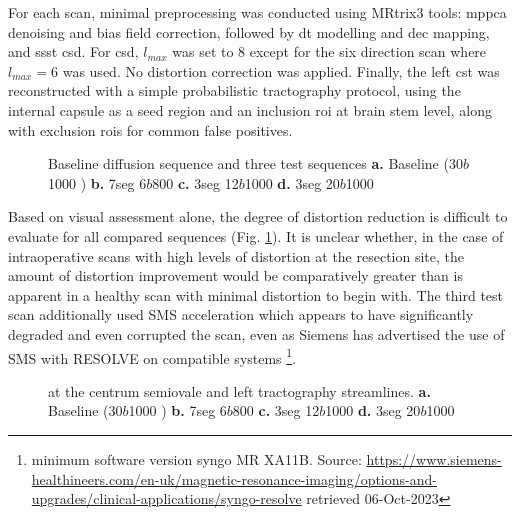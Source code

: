 For each scan, minimal preprocessing was conducted using MRtrix3\autocite{Tournier2019} tools:
\Gls{mppca} denoising and bias field correction, followed by \gls{dt} modelling and \gls{dec} mapping, and \gls{ssst} \gls{csd}.
For \gls{csd}, $l_{max}$ was set to 8 except for the six direction scan where $l_{max}=6$ was used.
No distortion correction was applied.
Finally, the left \gls{cst} was reconstructed with a simple probabilistic tractography protocol, using the internal capsule as a seed region and an inclusion \gls{roi} at brain stem level, along with exclusion \glspl{roi} for common false positives.

\begin{figure}[htb!]
  \centering
  
  \caption[RS-EPI test scan results]{Baseline  diffusion sequence and three  test sequences
    \textbf{\sffamily a.} Baseline (30\x{}$b$1000  )
    \textbf{\sffamily b.} 7seg 6\x{}$b$800
    \textbf{\sffamily c.} 3seg 12\x{}$b$1000
    \textbf{\sffamily d.} 3seg 20\x{}$b$1000}\label{fig:rsepi}
\end{figure}

Based on visual assessment alone, the degree of distortion reduction is difficult to evaluate for all compared sequences (Fig. \ref{fig:rsepi}).
It is unclear whether, in the case of intraoperative scans with high levels of distortion at the resection site, the amount of distortion improvement would be comparatively greater than is apparent in a healthy scan with minimal distortion to begin with.
The third test scan additionally used SMS acceleration which appears to have significantly degraded and even corrupted the scan, even as Siemens has advertised the use of SMS with RESOLVE on compatible systems
\footnote[2]{minimum software version syngo MR XA11B. Source: \url{https://www.siemens-healthineers.com/en-uk/magnetic-resonance-imaging/options-and-upgrades/clinical-applications/syngo-resolve} retrieved 06-Oct-2023}.


\begin{figure}[htb!]
  \centering
  
  \caption[RS-EPI test scan fibre orientation and CST reconstructions]{ at the centrum semiovale and left  tractography streamlines.
  \textbf{\sffamily a.} Baseline (30\x{}$b$1000  )
  \textbf{\sffamily b.} 7seg 6\x{}$b$800
  \textbf{\sffamily c.} 3seg 12\x{}$b$1000
  \textbf{\sffamily d.} 3seg 20\x{}$b$1000}
  \label{fig:rsepi-fod}
\end{figure}

